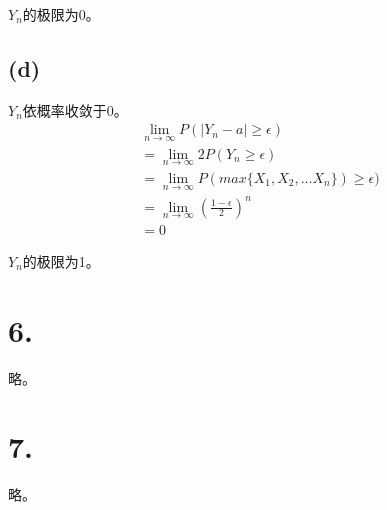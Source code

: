 \documentclass[UTF8]{report}
\begin{document}
            $Y_n$的极限为0。
        \subsection*{(d)}
            $Y_n$依概率收敛于0。
            $$\begin{array}{l}
                \lim_{n \to \infty}P(|Y_n - a| \geq \epsilon)\\
                = \lim_{n \to \infty}2P(Y_n \geq \epsilon)\\
                = \lim_{n \to \infty}P(max\{X_1, X_2, \dots X_n\}) \geq \epsilon)\\
                = \lim_{n \to \infty}(\frac{1 - \epsilon}{2})^n\\
                = 0
            \end{array}$$

            $Y_n$的极限为1。
    \section*{6.}
        略。
    \section*{7.}
        略。
\end{document}
